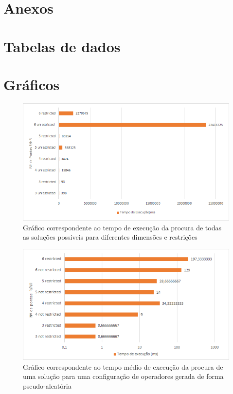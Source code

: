 \clearpage
\section{Anexos}
\appendix
\section{Tabelas de dados}









\section{Gráficos}

\begin{figure}[!h]
\includegraphics[width=\textwidth]{images/all_solutions_execution_time.png}
\caption{Gráfico correspondente ao tempo de execução da procura de todas as soluções possíveis para diferentes dimensões e restrições} \label{fig:tempo_execucao_todas_solucoes}
\end{figure}

\begin{figure}[!h]
\includegraphics[width=\textwidth]{images/execution_time_random.png}
\caption{Gráfico correspondente ao tempo médio de execução da procura de uma solução para uma configuração de operadores gerada de forma pseudo-aleatória} \label{fig:tempo_execucao_todas_solucoes_random}
\end{figure}

